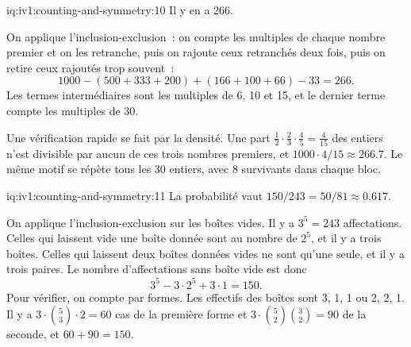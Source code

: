 \enlargethispage{-5\baselineskip}%
\begin{solution}{iq:iv1:counting-and-symmetry:10}
Il y en a 266.

On applique l'inclusion-exclusion~: on compte les multiples de chaque nombre premier et on les retranche, puis on rajoute ceux retranchés deux fois, puis on retire ceux rajoutés trop souvent~:
\[
1000 - (500 + 333 + 200) + (166 + 100 + 66) - 33 = 266.
\]
Les termes intermédiaires sont les multiples de 6, 10 et 15, et le dernier terme compte les multiples de 30.

Une vérification rapide se fait par la densité. Une part $\tfrac12 \cdot \tfrac23 \cdot \tfrac45 = \tfrac{4}{15}$ des entiers n'est divisible par aucun de ces trois nombres premiers, et $1000 \cdot 4/15 \approx 266.7$. Le même motif se répète tous les 30 entiers, avec 8 survivants dans chaque bloc.

\end{solution}

\begin{solution}{iq:iv1:counting-and-symmetry:11}
La probabilité vaut $150/243 = 50/81 \approx 0.617$.

On applique l'inclusion-exclusion sur les boîtes vides. Il y a $3^5 = 243$ affectations. Celles qui laissent vide une boîte donnée sont au nombre de $2^5$, et il y a trois boîtes. Celles qui laissent deux boîtes données vides ne sont qu'une seule, et il y a trois paires. Le nombre d'affectations sans boîte vide est donc
\[
3^5 - 3 \cdot 2^5 + 3 \cdot 1 = 150.
\]
Pour vérifier, on compte par formes. Les effectifs des boîtes sont 3, 1, 1 ou 2, 2, 1. Il y a $3 \cdot \binom{5}{3} \cdot 2 = 60$ cas de la première forme et $3 \cdot \binom{5}{2}\binom{3}{2} = 90$ de la seconde, et $60 + 90 = 150$.

\end{solution}

